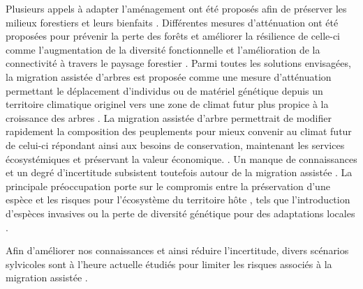Plusieurs appels à adapter l'aménagement ont été proposés afin de préserver les milieux forestiers et leurs bienfaits \citep{Nagel2017Adaptivesilviculture,Messier2021sakeresilience}.
Différentes mesures d'atténuation ont été proposées pour prévenir la perte des forêts et améliorer la résilience de celle-ci comme l'augmentation de la diversité fonctionnelle et l'amélioration de la connectivité à travers le paysage forestier \citep{Messier2019functionalcomplex}.
Parmi toutes les solutions envisagées, la migration assistée d'arbres est proposée comme une mesure d'atténuation permettant le déplacement d'individus ou de matériel génétique depuis un territoire climatique originel vers une zone de climat futur plus propice à la croissance des arbres \citep{Vitt2010Assistedmigration,Dumroese2015Considerationsrestoring,Park2018Informationunderload,Park2023Provenancetrials}. 
La migration assistée d'arbre permettrait de modifier rapidement la composition des peuplements pour mieux convenir au climat futur de celui-ci \citep{Pedlar2011implementationassisted} 
répondant ainsi aux besoins de conservation, maintenant les services écosystémiques et préservant la valeur économique. \citep{Ste-Marie2011Assistedmigration,Winder2011Ecologicalimplications}.
Un manque de connaissances et un degré d'incertitude subsistent toutefois autour de la migration assistée \citep{Klenk2015assistedmigration,Park2018Informationunderload}. 
La principale préoccupation porte sur le compromis entre la préservation d'une espèce et les risques pour l'écosystème du territoire hôte \citep{Ricciardi2009Assistedcolonization}, 
tels que l'introduction d'espèces invasives ou la perte de diversité génétique pour des adaptations locales \citep{McLachlan2007frameworkdebate,Vitt2010Assistedmigration,Hewitt2011Takingstock,VanDaele2022Genomicanalyses}.

Afin d'améliorer nos connaissances et ainsi réduire l'incertitude, divers scénarios sylvicoles sont à l'heure actuelle étudiés pour limiter les risques associés à la migration assistée \citep{royoDesiredREgenerationAssisted2023}.





